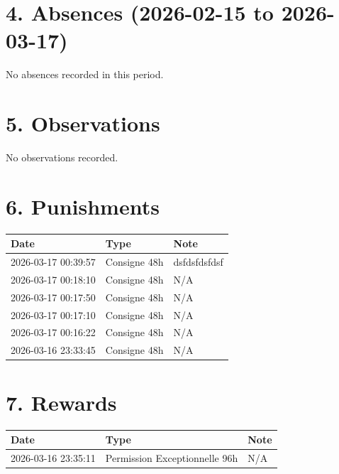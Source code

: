 \documentclass[a4paper,12pt]{article}
\begin{document}
\section*{4. Absences (2026-02-15 to 2026-03-17)}
No absences recorded in this period.
\section*{5. Observations}
No observations recorded.
\section*{6. Punishments}
\begin{longtable}{lp{4cm}p{6cm}}
\hline \textbf{Date} & \textbf{Type} & \textbf{Note} \\ \hline
\endhead
2026-03-17 00:39:57 & Consigne 48h & dsfdsfdsfdsf \\
2026-03-17 00:18:10 & Consigne 48h & N/A \\
2026-03-17 00:17:50 & Consigne 48h & N/A \\
2026-03-17 00:17:10 & Consigne 48h & N/A \\
2026-03-17 00:16:22 & Consigne 48h & N/A \\
2026-03-16 23:33:45 & Consigne 48h & N/A \\
\hline
\end{longtable}

\section*{7. Rewards}
\begin{longtable}{lp{4cm}p{6cm}}
\hline \textbf{Date} & \textbf{Type} & \textbf{Note} \\ \hline
\endhead
2026-03-16 23:35:11 & Permission Exceptionnelle 96h & N/A \\
\hline
\end{longtable}
\end{document}
